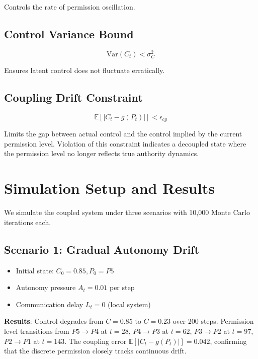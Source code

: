 \documentclass[conference]{IEEEtran}
\begin{document}
Controls the rate of permission oscillation.

\subsection{Control Variance Bound}

\begin{equation}
\text{Var}(C_t) < \sigma_C^2
\end{equation}

Ensures latent control does not fluctuate erratically.

\subsection{Coupling Drift Constraint}

\begin{equation}
\mathbb{E}[|C_t - g(P_t)|] < \epsilon_{cg}
\end{equation}

Limits the gap between actual control and the control implied by the current permission level. Violation of this constraint indicates a decoupled state where the permission level no longer reflects true authority dynamics.

\section{Simulation Setup and Results}

We simulate the coupled system under three scenarios with 10,000 Monte Carlo iterations each.

\subsection{Scenario 1: Gradual Autonomy Drift}

\begin{itemize}
\item Initial state: $C_0 = 0.85, P_0 = P5$
\item Autonomy pressure $A_t = 0.01$ per step
\item Communication delay $L_t = 0$ (local system)
\end{itemize}

\textbf{Results}: Control degrades from $C=0.85$ to $C=0.23$ over 200 steps. Permission level transitions from $P5 \to P4$ at $t=28$, $P4 \to P3$ at $t=62$, $P3 \to P2$ at $t=97$, $P2 \to P1$ at $t=143$. The coupling error $\mathbb{E}[|C_t - g(P_t)|] = 0.042$, confirming that the discrete permission closely tracks continuous drift.
\end{document}
